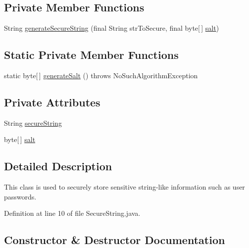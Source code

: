 \subsection*{Private Member Functions}
\begin{DoxyCompactItemize}
\item 
String \hyperlink{classcom_1_1activitytracker_1_1_secure_string_aa2521591ab15fb4c5a2461c04b08320f}{generate\+Secure\+String} (final String str\+To\+Secure, final byte\mbox{[}$\,$\mbox{]} \hyperlink{classcom_1_1activitytracker_1_1_secure_string_a8549ead1f186ff0c2520818b03d1cc21}{salt})
\end{DoxyCompactItemize}
\subsection*{Static Private Member Functions}
\begin{DoxyCompactItemize}
\item 
static byte\mbox{[}$\,$\mbox{]} \hyperlink{classcom_1_1activitytracker_1_1_secure_string_a1907ad109bb5e64291fabd3ff459ef49}{generate\+Salt} ()  throws No\+Such\+Algorithm\+Exception 
\end{DoxyCompactItemize}
\subsection*{Private Attributes}
\begin{DoxyCompactItemize}
\item 
String \hyperlink{classcom_1_1activitytracker_1_1_secure_string_a1448f7b8865c6c57cc7218662ee7f1ee}{secure\+String}
\item 
byte\mbox{[}$\,$\mbox{]} \hyperlink{classcom_1_1activitytracker_1_1_secure_string_a8549ead1f186ff0c2520818b03d1cc21}{salt}
\end{DoxyCompactItemize}


\subsection{Detailed Description}
This class is used to securely store sensitive string-\/like information such as user passwords. 

Definition at line 10 of file Secure\+String.\+java.



\subsection{Constructor \& Destructor Documentation}
